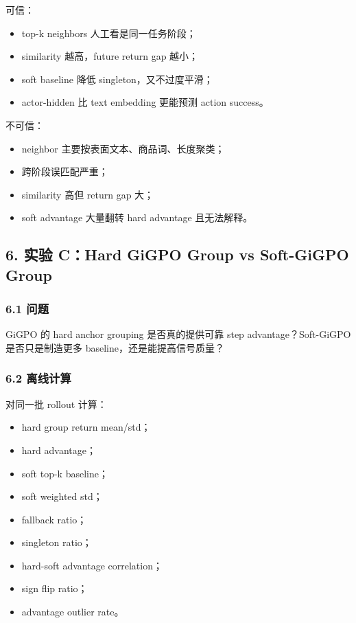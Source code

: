 \documentclass[
  10pt,
]{ctexart}
\providecommand{\tightlist}{%
  \setlength{\itemsep}{0pt}\setlength{\parskip}{0pt}}
\begin{document}
可信：

\begin{itemize}
\tightlist
\item
  top-k neighbors 人工看是同一任务阶段；
\item
  similarity 越高，future return gap 越小；
\item
  soft baseline 降低 singleton，又不过度平滑；
\item
  actor-hidden 比 text embedding 更能预测 action success。
\end{itemize}

不可信：

\begin{itemize}
\tightlist
\item
  neighbor 主要按表面文本、商品词、长度聚类；
\item
  跨阶段误匹配严重；
\item
  similarity 高但 return gap 大；
\item
  soft advantage 大量翻转 hard advantage 且无法解释。
\end{itemize}

\subsection{6. 实验 C：Hard GiGPO Group vs Soft-GiGPO
Group}\label{ux5b9eux9a8c-chard-gigpo-group-vs-soft-gigpo-group}

\subsubsection{6.1 问题}\label{ux95eeux9898-3}

GiGPO 的 hard anchor grouping 是否真的提供可靠 step
advantage？Soft-GiGPO 是否只是制造更多 baseline，还是能提高信号质量？

\subsubsection{6.2 离线计算}\label{ux79bbux7ebfux8ba1ux7b97}

对同一批 rollout 计算：

\begin{itemize}
\tightlist
\item
  hard group return mean/std；
\item
  hard advantage；
\item
  soft top-k baseline；
\item
  soft weighted std；
\item
  fallback ratio；
\item
  singleton ratio；
\item
  hard-soft advantage correlation；
\item
  sign flip ratio；
\item
  advantage outlier rate。
\end{itemize}
\end{document}
